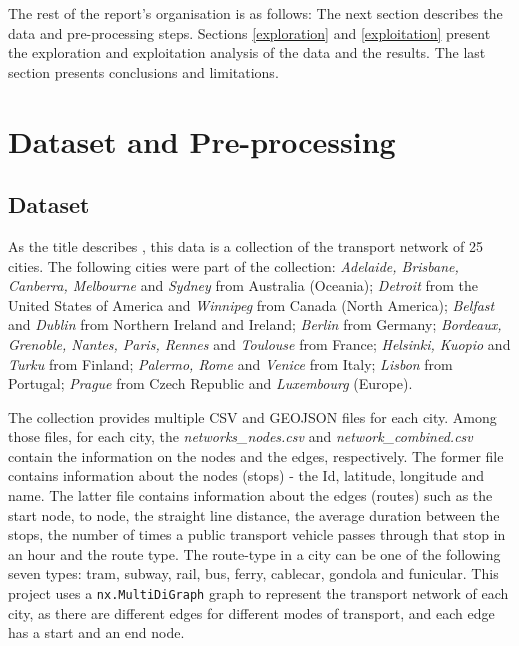 \documentclass{article}
\theoremstyle{plain}
\theoremstyle{definition}
\theoremstyle{remark}
\begin{document}
The rest of the report's organisation is as follows: The next section describes the data and pre-processing steps. Sections \ref{exploration} and \ref{exploitation} present the exploration and exploitation analysis of the data and the results. The last section presents conclusions and limitations.

\section{Dataset and Pre-processing}
\label{dataset}

\subsection{Dataset}

As the title describes \cite{rainer_kujala_2018_1186215}, this data is a collection of the transport network of 25 cities. The following cities were part of the collection: \textit{Adelaide, Brisbane, Canberra, Melbourne} and \textit{Sydney} from Australia (Oceania); \textit{Detroit} from the United States of America and \textit{Winnipeg} from Canada (North America); \textit{Belfast} and \textit{Dublin} from Northern Ireland and Ireland; \textit{Berlin} from Germany; \textit{Bordeaux, Grenoble, Nantes, Paris, Rennes} and \textit{Toulouse} from France; \textit{Helsinki, Kuopio} and \textit{Turku} from Finland; \textit{Palermo, Rome} and \textit{Venice} from Italy; \textit{Lisbon} from Portugal; \textit{Prague} from Czech Republic and \textit{Luxembourg} (Europe). 

The collection provides multiple CSV and GEOJSON files for each city. Among those files, for each city, the \textit{networks\_nodes.csv} and \textit{network\_combined.csv} contain the information on the nodes and the edges, respectively. The former file contains information about the nodes (stops) - the Id, latitude, longitude and name. The latter file contains information about the edges (routes) such as the start node, to node, the straight line distance, the average duration between the stops, the number of times a public transport vehicle passes through that stop in an hour and the route type. The route-type in a city can be one of the following seven types: tram, subway, rail, bus, ferry, cablecar, gondola and funicular. This project uses a \texttt{nx.MultiDiGraph} graph to represent the transport network of each city, as there are different edges for different modes of transport, and each edge has a start and an end node.
\end{document}
